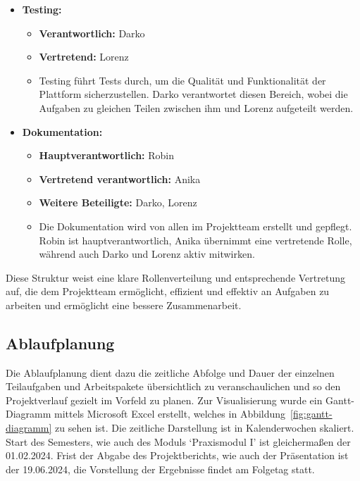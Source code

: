 \begin{itemize}[itemsep=1em, leftmargin=*]
    \item \textbf{Testing:}
    \begin{itemize}
        \item \textbf{Verantwortlich:} Darko
        \item \textbf{Vertretend:} Lorenz
        \item Testing führt Tests durch, um die Qualität und Funktionalität der Plattform sicherzustellen.
        Darko verantwortet diesen Bereich, wobei die Aufgaben zu gleichen Teilen zwischen ihm und Lorenz aufgeteilt werden.
    \end{itemize}

    \item \textbf{Dokumentation:}
    \begin{itemize}
        \item \textbf{Hauptverantwortlich:} Robin
        \item \textbf{Vertretend verantwortlich:} Anika
        \item \textbf{Weitere Beteiligte:} Darko, Lorenz
        \item Die Dokumentation wird von allen im Projektteam erstellt und gepflegt.
        Robin ist hauptverantwortlich, Anika übernimmt eine vertretende Rolle, während auch Darko und Lorenz aktiv mitwirken.
    \end{itemize}
\end{itemize}


Diese Struktur weist eine klare Rollenverteilung und entsprechende Vertretung auf, die dem Projektteam ermöglicht, effizient und effektiv an Aufgaben zu arbeiten und ermöglicht eine bessere Zusammenarbeit.

\newpage

\subsection{Ablaufplanung}\label{subsec:ablaufplan}

Die Ablaufplanung dient dazu die zeitliche Abfolge und Dauer der einzelnen Teilaufgaben und Arbeitspakete übersichtlich zu veranschaulichen und so den Projektverlauf gezielt im Vorfeld zu planen.
Zur Visualisierung wurde ein Gantt-Diagramm mittels Microsoft Excel erstellt, welches in Abbildung~\ref{fig:gantt-diagramm} zu sehen ist.
Die zeitliche Darstellung ist in Kalenderwochen skaliert.
Start des Semesters, wie auch des Moduls `Praxismodul I' ist gleichermaßen der 01.02.2024.
Frist der Abgabe des Projektberichts, wie auch der Präsentation ist der 19.06.2024, die Vorstellung der Ergebnisse findet am Folgetag statt.

